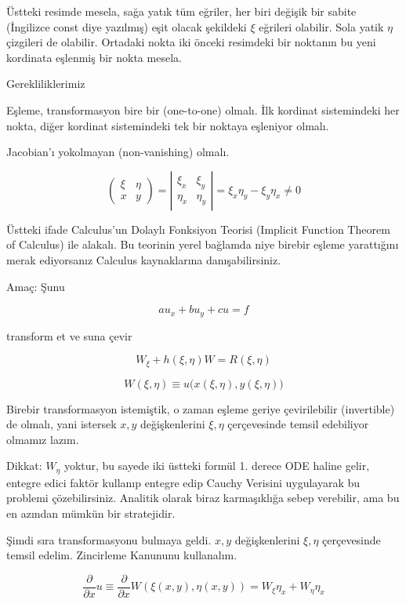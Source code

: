 \documentclass[12pt,fleqn]{article}\usepackage{../../common}
\begin{document}
Üstteki resimde mesela, sağa yatık tüm eğriler, her biri değişik bir sabite
(İngilizce const diye yazılmış) eşit olacak şekildeki $\xi$ eğrileri
olabilir. Sola yatik $\eta$ çizgileri de olabilir. Ortadaki nokta iki
önceki resimdeki bir noktanın bu yeni kordinata eşlenmiş bir nokta mesela.

Gerekliliklerimiz

Eşleme, transformasyon bire bir (one-to-one) olmalı. İlk kordinat
sistemindeki her nokta, diğer kordinat sistemindeki tek bir noktaya
eşleniyor olmalı. 

Jacobian'ı yokolmayan (non-vanishing) olmalı. 

$$ 
\left(\begin{array}{rr}
\xi & \eta \\
x & y
\end{array}\right) = 
\left|\begin{array}{rr}
\xi_x & \xi_y \\
\eta_x & \eta_y
\end{array}\right| =
\xi_x \eta_y - \xi_y \eta_x \ne 0
 $$

Üstteki ifade Calculus'un Dolaylı Fonksiyon Teorisi (Implicit Function
Theorem of Calculus) ile alakalı. Bu teorinin yerel bağlamda niye birebir
eşleme yarattığını merak ediyorsanız Calculus kaynaklarına
danışabilirsiniz. 

Amaç: Şunu 

$$ au_x + bu_y + cu = f $$

transform et ve suna çevir

$$ W_\xi + h(\xi, \eta)W = R(\xi,\eta)$$


$$ W(\xi,\eta) \equiv u \bigg( x(\xi,\eta),y(\xi,\eta) \bigg) $$

Birebir transformasyon istemiştik, o zaman eşleme geriye çevirilebilir
(invertible) de olmalı, yani istersek $x,y$ değişkenlerini $\xi,\eta$
çerçevesinde temsil edebiliyor olmamız lazım. 

Dikkat: $W_\eta$ yoktur, bu sayede iki üstteki formül 1. derece ODE haline
gelir, entegre edici faktör kullanıp entegre edip Cauchy Verisini
uygulayarak bu problemi çözebilirsiniz. Analitik olarak biraz karmaşıklığa
sebep verebilir, ama bu en azından mümkün bir stratejidir. 

Şimdi sıra transformasyonu bulmaya geldi. $x,y$ değişkenlerini $\xi,\eta$
çerçevesinde temsil edelim. Zincirleme Kanununu kullanalım. 

$$ \frac{\partial }{\partial x}u \equiv
\frac{\partial }{\partial x}W(\xi(x,y),\eta(x,y)) =
W_\xi\eta_x + W_\eta\eta_x 
 $$
\end{document}
